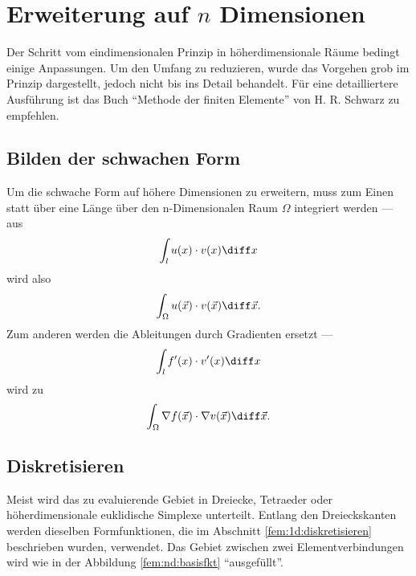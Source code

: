 %
%
%
%
\section{Erweiterung auf $n$ Dimensionen\label{fem:nD}}
Der Schritt vom eindimensionalen Prinzip in höherdimensionale Räume bedingt einige Anpassungen. 
Um den Umfang zu reduzieren, wurde das Vorgehen grob im Prinzip dargestellt, jedoch nicht bis ins Detail behandelt.
Für eine detailliertere Ausführung ist das Buch ``Methode der finiten Elemente'' \cite{fem:bib:methode_der_finiten_elemente} von H. R. Schwarz zu empfehlen.


\subsection{Bilden der schwachen Form}
Um die schwache Form auf höhere Dimensionen zu erweitern, muss zum Einen statt über eine Länge über den n-Dimensionalen Raum $\Omega$ integriert werden --- aus 
\begin{equation}
    \int_{l} u(x) \cdot v(x) \diff x
\end{equation}
wird also
\begin{equation}
    \int_{\Omega} u(\vec{x}) \cdot v(\vec{x}) \diff \vec{x}.
\end{equation}
Zum anderen werden die Ableitungen durch Gradienten ersetzt ---
\begin{equation}
    \int_{l} f'(x) \cdot v'(x) \diff x
\end{equation}
wird zu
\begin{equation}
    \int_{\Omega} \nabla f(\vec{x}) \cdot \nabla v(\vec{x}) \diff \vec{x}.
\end{equation}


\subsection{Diskretisieren}
Meist wird das zu evaluierende Gebiet in Dreiecke, Tetraeder oder höherdimensionale euklidische Simplexe unterteilt. 
Entlang den Dreieckskanten werden dieselben Formfunktionen, die im Abschnitt \ref{fem:1d:diskretisieren} beschrieben wurden, verwendet.
Das Gebiet zwischen zwei Elementverbindungen wird wie in der Abbildung \ref{fem:nd:basisfkt} ``ausgefüllt''.



